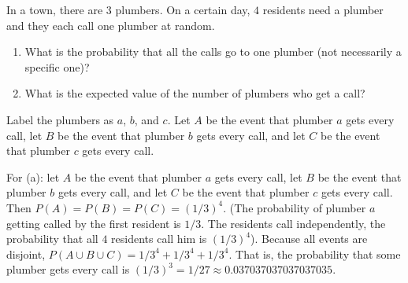 \newpage
\begin{problem}[Handout 3, \# 5]
  In a town, there are \(3\) plumbers. On a certain day, \(4\) residents
  need a plumber and they each call one plumber at random.
  \begin{enumerate}[label=(\alph*),noitemsep]
  \item What is the probability that all the calls go to one plumber (not
    necessarily a specific one)?
  \item What is the expected value of the number of plumbers who get a
    call?
  \end{enumerate}
\end{problem}
\begin{solution}
  Label the plumbers as $a$, $b$, and $c$. Let $A$ be the event that
  plumber $a$ gets every call, let $B$ be the event that plumber $b$ gets
  every call, and let $C$ be the event that plumber $c$ gets every call.

  For (a): let $A$ be the event that plumber $a$ gets every call, let $B$
  be the event that plumber $b$ gets every call, and let $C$ be the event
  that plumber $c$ gets every call.  Then $P(A)=P(B)=P(C)=(1/3)^4$. (The
  probability of plumber $a$ getting called by the first resident is
  $1/3$. The residents call independently, the probability that all $4$
  residents call him is $(1/3)^4$). Because all events are disjoint,
  $P(A\cup B\cup C)=1/3^4+1/3^4+1/3^4$. That is, the probability that some
  plumber gets every call is
  $(1/3)^3=1/27\approx \num{0.037037037037037035}$.


\end{solution}
